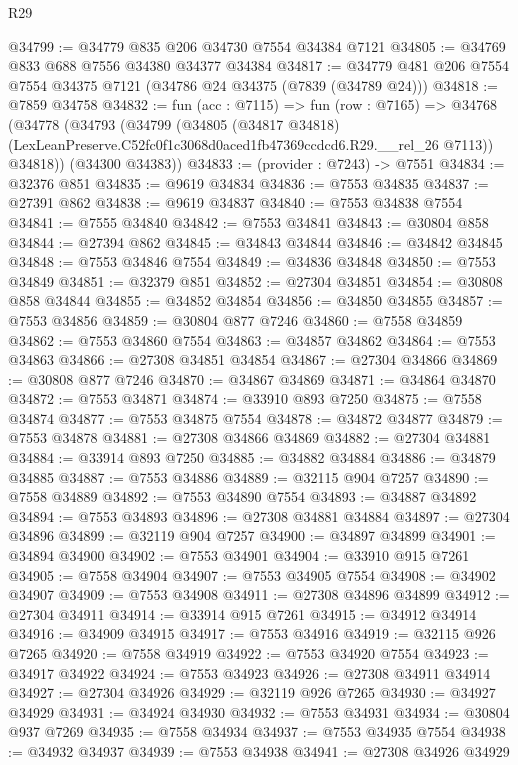 \begin{lexlean}{R29}
\begin{coremodule}
@34799 := @34779 @835 @206 @34730 @7554 @34384 @7121
@34805 := @34769 @833 @688 @7556 @34380 @34377 @34384
@34817 := @34779 @481 @206 @7554 @7554 @34375 @7121 (@34786 @24 @34375 (@7839 (@34789 @24)))
@34818 := @7859 @34758
@34832 := fun (acc : @7115) =>
  fun (row : @7165) =>
  @34768
    (@34778
      (@34793
        (@34799
          (@34805
            (@34817 @34818)
            (LexLeanPreserve.C52fc0f1c3068d0aced1fb47369ccdcd6.R29.__rel_26 @7113))
          @34818))
      (@34300 @34383))
@34833 := (provider : @7243) -> @7551
@34834 := @32376 @851
@34835 := @9619 @34834
@34836 := @7553 @34835
@34837 := @27391 @862
@34838 := @9619 @34837
@34840 := @7553 @34838 @7554
@34841 := @7555 @34840
@34842 := @7553 @34841
@34843 := @30804 @858
@34844 := @27394 @862
@34845 := @34843 @34844
@34846 := @34842 @34845
@34848 := @7553 @34846 @7554
@34849 := @34836 @34848
@34850 := @7553 @34849
@34851 := @32379 @851
@34852 := @27304 @34851
@34854 := @30808 @858 @34844
@34855 := @34852 @34854
@34856 := @34850 @34855
@34857 := @7553 @34856
@34859 := @30804 @877 @7246
@34860 := @7558 @34859
@34862 := @7553 @34860 @7554
@34863 := @34857 @34862
@34864 := @7553 @34863
@34866 := @27308 @34851 @34854
@34867 := @27304 @34866
@34869 := @30808 @877 @7246
@34870 := @34867 @34869
@34871 := @34864 @34870
@34872 := @7553 @34871
@34874 := @33910 @893 @7250
@34875 := @7558 @34874
@34877 := @7553 @34875 @7554
@34878 := @34872 @34877
@34879 := @7553 @34878
@34881 := @27308 @34866 @34869
@34882 := @27304 @34881
@34884 := @33914 @893 @7250
@34885 := @34882 @34884
@34886 := @34879 @34885
@34887 := @7553 @34886
@34889 := @32115 @904 @7257
@34890 := @7558 @34889
@34892 := @7553 @34890 @7554
@34893 := @34887 @34892
@34894 := @7553 @34893
@34896 := @27308 @34881 @34884
@34897 := @27304 @34896
@34899 := @32119 @904 @7257
@34900 := @34897 @34899
@34901 := @34894 @34900
@34902 := @7553 @34901
@34904 := @33910 @915 @7261
@34905 := @7558 @34904
@34907 := @7553 @34905 @7554
@34908 := @34902 @34907
@34909 := @7553 @34908
@34911 := @27308 @34896 @34899
@34912 := @27304 @34911
@34914 := @33914 @915 @7261
@34915 := @34912 @34914
@34916 := @34909 @34915
@34917 := @7553 @34916
@34919 := @32115 @926 @7265
@34920 := @7558 @34919
@34922 := @7553 @34920 @7554
@34923 := @34917 @34922
@34924 := @7553 @34923
@34926 := @27308 @34911 @34914
@34927 := @27304 @34926
@34929 := @32119 @926 @7265
@34930 := @34927 @34929
@34931 := @34924 @34930
@34932 := @7553 @34931
@34934 := @30804 @937 @7269
@34935 := @7558 @34934
@34937 := @7553 @34935 @7554
@34938 := @34932 @34937
@34939 := @7553 @34938
@34941 := @27308 @34926 @34929

\end{coremodule}
\end{lexlean}

